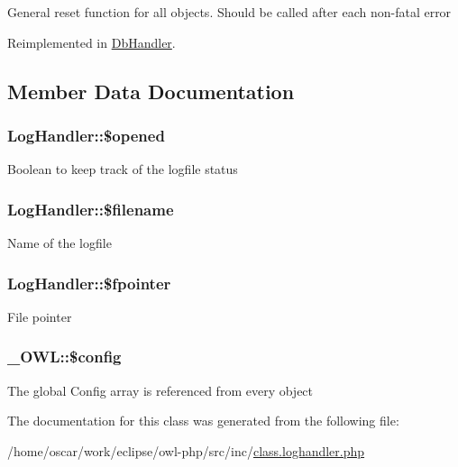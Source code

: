 General reset function for all objects. Should be called after each non-fatal error 

Reimplemented in \hyperlink{classDbHandler_9982df4830f05803935bb31bac7fae3d}{DbHandler}.

\subsection{Member Data Documentation}
\hypertarget{classLogHandler_956e7e71a9ff96c6301d1f41a5bf207e}{
\subsubsection{\setlength{\rightskip}{0pt plus 5cm}LogHandler::\$opened}}
\label{classLogHandler_956e7e71a9ff96c6301d1f41a5bf207e}


Boolean to keep track of the logfile status \hypertarget{classLogHandler_b51c12bcd654093b9d0153ab38ebad8c}{
\subsubsection{\setlength{\rightskip}{0pt plus 5cm}LogHandler::\$filename}}
\label{classLogHandler_b51c12bcd654093b9d0153ab38ebad8c}


Name of the logfile \hypertarget{classLogHandler_d65c8954bda40d8a33828f0a0a2cbf5b}{
\subsubsection{\setlength{\rightskip}{0pt plus 5cm}LogHandler::\$fpointer}}
\label{classLogHandler_d65c8954bda40d8a33828f0a0a2cbf5b}


File pointer \hypertarget{class__OWL_f37a011667dda12fc417a68a6f3077d1}{
\subsubsection{\setlength{\rightskip}{0pt plus 5cm}\_\-OWL::\$config}}
\label{class__OWL_f37a011667dda12fc417a68a6f3077d1}


The global Config array is referenced from every object 

The documentation for this class was generated from the following file:\begin{CompactItemize}
\item 
/home/oscar/work/eclipse/owl-php/src/inc/\hyperlink{class_8loghandler_8php}{class.loghandler.php}\end{CompactItemize}
